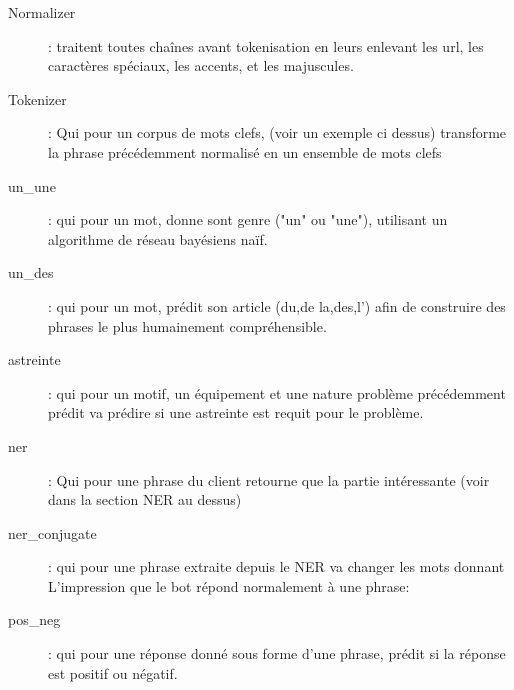 \begin{description}
\item[Normalizer]: traitent toutes chaînes avant tokenisation en leurs enlevant les url, les caractères spéciaux, les accents, et les majuscules.
\item[Tokenizer]: Qui pour un corpus de mots clefs, (voir un exemple ci dessus) transforme la phrase précédemment normalisé en un ensemble de mots clefs
\item[un\_une]: qui pour un mot, donne sont genre ("un" ou "une"), utilisant un algorithme de réseau bayésiens naïf.
\item[un\_des]: qui pour un mot, prédit son article (du,de la,des,l') afin de construire des phrases le plus humainement compréhensible.
\item[astreinte]: qui pour un motif, un équipement et une nature problème précédemment prédit va prédire si une astreinte est requit pour le problème.
\item[ner]: Qui pour une phrase du client retourne que la partie intéressante (voir dans la section NER au dessus)
\item[ner\_conjugate]: qui pour une phrase extraite depuis le NER va changer les mots donnant L’impression que le bot répond normalement à une phrase:
\item[pos\_neg]: qui pour une réponse donné sous forme d'une phrase, prédit si la réponse est positif ou négatif.
\end{description}

